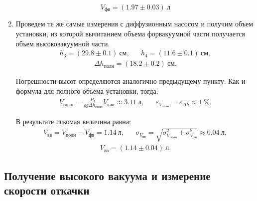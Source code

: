 \documentclass[a4paper,12pt]{article}
\begin{document}
\begin{enumerate}
        \begin{equation}
          V_{фв} = (1.97 \pm 0.03)~ л
        \end{equation}


  \item Проведем те же самые измерения с диффузионным насосом и получим объем установки, из которой вычитанием объема форвакуумной части получается объем высоковакуумной части.
        \begin{align}
          h_3 = (29.8 \pm 0.1) ~см, &  & h_4 = (11.6 \pm 0.1) ~см,
        \end{align}
        \begin{align}
          \Delta h_{полн} = (18.2 \pm 0.2) ~см.
        \end{align}

        Погрешности высот определяются аналогично предыдущему пункту. Как и формула для полного объема установки, тогда:
        \begin{align}
          V_\text{полн} = \frac{P_\text{А}}{\rho g \Delta h_\text{полн}} V_{кап} \approx 3.11~л, &  &
          \varepsilon_{V_{полн}} = \varepsilon_{\Delta h} \approx 1~\%.
        \end{align}

        В результате искомая величина равна:
        \begin{align}
          V_{вв} = V_{полн} - V_{фв} = 1.14~л, &  & \sigma_{V_{вв}} = \sqrt{\sigma_{V_{полн}}^2+ \sigma_{V_{фв}}^2} \approx 0.04~л,
        \end{align}
        \begin{align}
          V_{вв} = (1.14 \pm 0.04)~л.
        \end{align}

\end{enumerate}

\subsection{Получение высокого вакуума и измерение скорости откачки}
\end{document}
